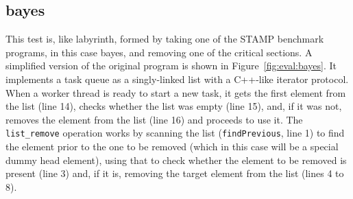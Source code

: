 
\subsection{bayes}

This test is, like labyrinth, formed by taking one of the STAMP
benchmark programs, in this case bayes, and removing one of the
critical sections.  A simplified version of the original program is
shown in Figure~\ref{fig:eval:bayes}.  It implements a task queue as a
singly-linked list with a C++-like iterator protocol\needCite{}.  When
a worker thread is ready to start a new task, it gets the first
element from the list (line 14), checks whether the list was empty
(line 15), and, if it was not, removes the element from the list (line
16) and proceeds to use it.  The \texttt{list\_remove} operation works
by scanning the list (\texttt{findPrevious}, line 1) to find the
element prior to the one to be removed (which in this case will be a
special dummy head element), using that to check whether the element
to be removed is present (line 3) and, if it is, removing the target
element from the list (lines 4 to 8).

